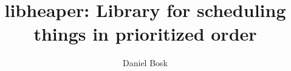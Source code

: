\documentclass{article}
\title{libheaper: Library for scheduling things in prioritized order}
\author{Daniel Bosk}
\affil{%
  \email{daniel@bosk.se}
}
\begin{document}
\maketitle
\begin{abstract}
  
\end{abstract}
\clearpage
\vspace*{\fill}
\begin{quote}
  
\end{quote}
\clearpage
\tableofcontents
\clearpage





\printbibliography
\end{document}
